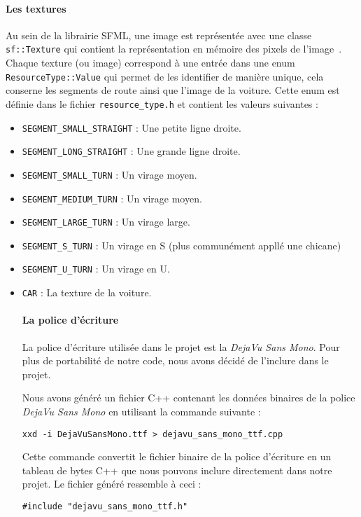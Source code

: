 \paragraph{Les textures}
Au sein de la librairie SFML, une image est représentée avec une classe \texttt{sf::Texture} qui contient la représentation en mémoire des pixels de l'image~\cite{sfml_sf_texture}.
Chaque texture (ou image) correspond à une entrée dans une enum \texttt{ResourceType::Value} qui permet de les identifier de manière unique, cela conserne les segments de route ainsi que l'image de la voiture.
Cette enum est définie dans le fichier \texttt{resource\_type.h} et contient les valeurs suivantes :
\begin{itemize}
    \item \texttt{SEGMENT\_SMALL\_STRAIGHT} : Une petite ligne droite.
    \item \texttt{SEGMENT\_LONG\_STRAIGHT} : Une grande ligne droite.
    \item \texttt{SEGMENT\_SMALL\_TURN} : Un virage moyen.
    \item \texttt{SEGMENT\_MEDIUM\_TURN} : Un virage moyen.
    \item \texttt{SEGMENT\_LARGE\_TURN} : Un virage large.
    \item \texttt{SEGMENT\_S\_TURN} : Un virage en S (plus communément appllé une chicane)
    \item \texttt{SEGMENT\_U\_TURN} : Un virage en U\@.
    \item \texttt{CAR} : La texture de la voiture.

\paragraph{La police d'écriture}
La police d'écriture utilisée dans le projet est la \textit{DejaVu Sans Mono}.
Pour plus de portabilité de notre code, nous avons décidé de l'inclure dans le projet.

Nous avons généré un fichier C++ contenant les données binaires de la police \textit{DejaVu Sans Mono} en utilisant la commande suivante :
\begin{lstlisting}[style=BashStyle,label={lst:generation_dejavusansmonottf_h}]
xxd -i DejaVuSansMono.ttf > dejavu_sans_mono_ttf.cpp
\end{lstlisting}
Cette commande convertit le fichier binaire de la police d'écriture en un tableau de bytes C++ que nous pouvons inclure directement dans notre projet.
Le fichier généré ressemble à ceci :
\begin{lstlisting}[style=CStyle,label={lst:example_generated_from_xxd_i}]
#include "dejavu_sans_mono_ttf.h"


\end{lstlisting}
\end{itemize}
